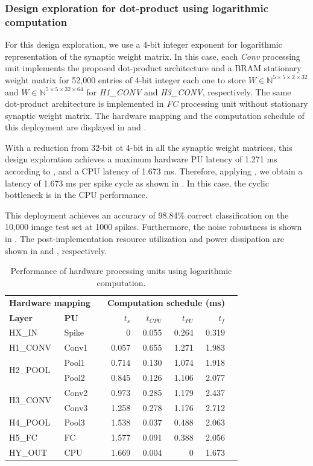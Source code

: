 \subsubsection{Design exploration for dot-product using logarithmic computation}
For this design exploration, we use a 4-bit integer exponent for logarithmic representation of the synaptic weight matrix. In this case, each \emph{Conv} processing unit implements the proposed dot-product architecture and a BRAM stationary weight matrix for 52,000 entries of 4-bit integer each one to store $W\in\mathbb{N}^{5\times 5\times 2\times 32}$ and $W\in\mathbb{N}^{5\times 5\times 32\times 64}$ for \emph{H1\_CONV} and \emph{H3\_CONV}, respectively. The same dot-product architecture is implemented in \emph{FC} processing unit without stationary synaptic weight matrix. The hardware mapping and the computation schedule of this deployment are displayed in  and .

With a reduction from 32-bit ot 4-bit in all the synaptic weight matrices, this design exploration achieves a maximum hardware PU latency of 1.271 ms according to , and a CPU latency of 1.673 ms. Therefore, applying , we obtain a latency of 1.673 ms per spike cycle as shown in . In this case, the cyclic bottleneck is in the CPU performance.

This deployment achieves an accuracy of 98.84\% correct classification on the 10,000 image test set at 1000 spikes. Furthermore, the noise robustness is shown in . The post-implementation resource utilization and power dissipation are shown in  and , respectively.

\begin{table}[t!]\centering
	\caption{Performance of hardware processing units using logarithmic computation.}\label{tab:latency_log}
	\scriptsize
	\begin{tabular}{llrrrrrr}\toprule
		\multicolumn{2}{c}{\textbf{Hardware mapping}} & &\multicolumn{4}{c}{\textbf{Computation schedule (ms)}} \\\cmidrule{1-2}\cmidrule{4-7}
		\textbf{Layer} &\textbf{PU} & &$t_s$ &$t_{CPU}$ &$t_{PU}$ &$t_f$ \\\midrule
		HX\_IN &Spike & &0 &0.055 &0.264 &0.319 \\
		H1\_CONV &Conv1 & &0.057 &0.655 &1.271 &1.983 \\
		\multirow{2}{*}{H2\_POOL} &Pool1 & &0.714 &0.130 &1.074 &1.918 \\
		&Pool2 & &0.845 &0.126 &1.106 &2.077 \\
		\multirow{2}{*}{H3\_CONV} &Conv2 & &0.973 &0.285 &1.179 &2.437 \\
		&Conv3 & &1.258 &0.278 &1.176 &2.712 \\
		H4\_POOL &Pool3 & &1.538 &0.037 &0.488 &2.063 \\
		H5\_FC &FC & &1.577 &0.091 &0.388 &2.056 \\
		HY\_OUT &CPU & &1.669 &0.004 &0 &1.673 \\
		\bottomrule
	\end{tabular}
\end{table}

